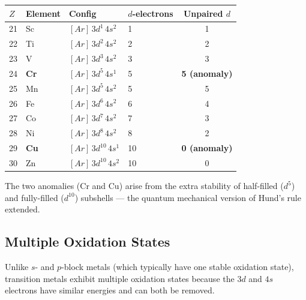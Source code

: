 \documentclass[12pt, a4paper]{book}
\begin{document}
\begin{center}
\small
\begin{tabular}{llllc}
\toprule
$Z$ & Element & Config & $d$-electrons & Unpaired $d$ \\
\midrule
21 & Sc & $[Ar]\,3d^1\,4s^2$ & 1 & 1 \\
22 & Ti & $[Ar]\,3d^2\,4s^2$ & 2 & 2 \\
23 & V  & $[Ar]\,3d^3\,4s^2$ & 3 & 3 \\
24 & \textbf{Cr} & $[Ar]\,3d^5\,4s^1$ & 5 & \textbf{5 (anomaly)} \\
25 & Mn & $[Ar]\,3d^5\,4s^2$ & 5 & 5 \\
26 & Fe & $[Ar]\,3d^6\,4s^2$ & 6 & 4 \\
27 & Co & $[Ar]\,3d^7\,4s^2$ & 7 & 3 \\
28 & Ni & $[Ar]\,3d^8\,4s^2$ & 8 & 2 \\
29 & \textbf{Cu} & $[Ar]\,3d^{10}\,4s^1$ & 10 & \textbf{0 (anomaly)} \\
30 & Zn & $[Ar]\,3d^{10}\,4s^2$ & 10 & 0 \\
\bottomrule
\end{tabular}
\end{center}

The two anomalies (Cr and Cu) arise from the extra stability
of half-filled ($d^5$) and fully-filled ($d^{10}$) subshells ---
the quantum mechanical version of Hund's rule extended.

\subsection{Multiple Oxidation States}

Unlike $s$- and $p$-block metals (which typically have
one stable oxidation state), transition metals exhibit
multiple oxidation states because the $3d$ and $4s$
electrons have similar energies and can both be removed.
\end{document}
